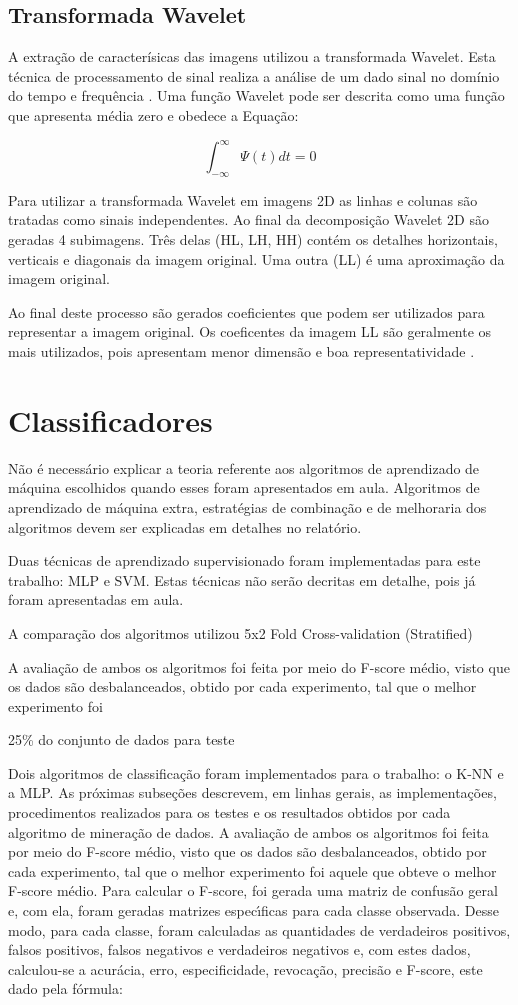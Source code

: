 \documentclass[conference]{IEEEtran}
\begin{document}
\subsection{Transformada Wavelet}
A extração de caracterísicas das imagens utilizou a transformada Wavelet. Esta técnica de processamento de sinal realiza a análise de um dado sinal no domínio do tempo e frequência \cite{costa2011ensemble}. Uma função Wavelet pode ser descrita como uma função que apresenta média zero e obedece a Equação:

\[\int_{-\infty}^{\infty} \Psi(t)dt = 0\]

Para utilizar a transformada Wavelet em imagens 2D as linhas e colunas são tratadas como sinais independentes. Ao final da decomposição Wavelet 2D são geradas 4 subimagens. Três delas (HL, LH, HH) contém os detalhes horizontais, verticais e diagonais da imagem original. Uma outra (LL) é uma aproximação da imagem original.

Ao final deste processo são gerados coeficientes que podem ser utilizados para representar a imagem original. Os coeficentes da imagem LL são geralmente os mais utilizados, pois apresentam menor dimensão e boa representatividade \cite{burrus1997introduction}.

\section{Classificadores}
Não é necessário explicar a teoria referente aos algoritmos de aprendizado de máquina
escolhidos quando esses foram apresentados em aula. Algoritmos de aprendizado de máquina
extra, estratégias de combinação e de melhoraria dos algoritmos devem ser explicadas em
detalhes no relatório.

Duas técnicas de aprendizado supervisionado foram implementadas para este trabalho: MLP e SVM. Estas técnicas não serão decritas em detalhe, pois já foram apresentadas em aula.

A comparação dos algoritmos utilizou 5x2 Fold Cross-validation (Stratified)

 A avaliação de ambos os algoritmos foi feita por meio do
F-score médio, visto que os dados são desbalanceados, obtido
por cada experimento, tal que o melhor experimento foi

25\% do conjunto de dados para teste


Dois algoritmos de classificação foram implementados
para o trabalho: o K-NN e a MLP. As próximas
subseções descrevem, em linhas gerais, as implementações,
procedimentos realizados para os testes e os resultados
obtidos por cada algoritmo de mineração de dados.
A avaliação de ambos os algoritmos foi feita por meio do
F-score médio, visto que os dados são desbalanceados, obtido
por cada experimento, tal que o melhor experimento foi
aquele que obteve o melhor F-score médio.
Para calcular o F-score, foi gerada uma matriz de confusão
geral e, com ela, foram geradas matrizes especı́ficas para
cada classe observada. Desse modo, para cada classe, foram
calculadas as quantidades de verdadeiros positivos, falsos
positivos, falsos negativos e verdadeiros negativos e, com
estes dados, calculou-se a acurácia, erro, especificidade,
revocação, precisão e F-score, este dado pela fórmula:
\end{document}

